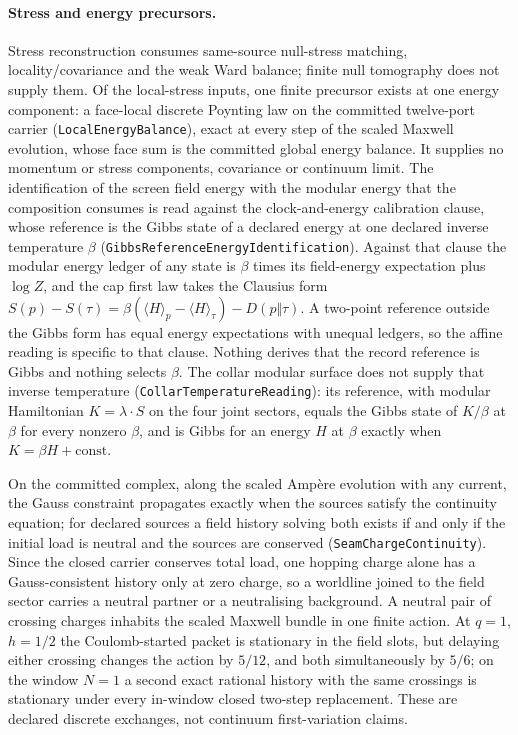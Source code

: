 \documentclass[11pt]{article}
\begin{document}
\paragraph{Stress and energy precursors.}
Stress reconstruction consumes same-source null-stress matching,
locality/covariance and the weak Ward balance; finite null tomography does
not supply them. Of the local-stress inputs, one finite precursor exists at
one energy component: a face-local discrete Poynting law on the committed
twelve-port carrier (\texttt{LocalEnergyBalance}), exact at every step of the
scaled Maxwell evolution, whose face sum is the committed global energy
balance. It supplies no momentum or stress components, covariance or
continuum limit. The identification of the screen field energy with the
modular energy that the composition consumes is read against the
clock-and-energy calibration clause, whose reference is the Gibbs state of a
declared energy at one declared inverse temperature \(\beta\)
(\texttt{GibbsReferenceEnergyIdentification}). Against that clause the modular
energy ledger of any state is \(\beta\) times its field-energy expectation plus
\(\log Z\), and the cap first law takes the Clausius form
\(S(p)-S(\tau)=\beta(\langle H\rangle_p-\langle H\rangle_\tau)-D(p\Vert\tau)\).
A two-point reference outside the Gibbs form has equal energy expectations with
unequal ledgers, so the affine reading is specific to that clause. Nothing
derives that the record reference is Gibbs and nothing selects \(\beta\). The
collar modular surface does not supply that inverse temperature
(\texttt{CollarTemperatureReading}): its reference, with modular Hamiltonian
\(K=\lambda\cdot S\) on the four joint sectors, equals the Gibbs state of
\(K/\beta\) at \(\beta\) for every nonzero \(\beta\), and is Gibbs for an
energy \(H\) at \(\beta\) exactly when \(K=\beta H+\mathrm{const}\).

On the committed complex, along the scaled Amp\`ere evolution with any
current, the Gauss constraint propagates exactly when the sources satisfy the
continuity equation; for declared sources a field history solving both exists
if and only if the initial load is neutral and the sources are conserved
(\texttt{SeamChargeContinuity}). Since the closed carrier conserves total load,
one hopping charge alone has a Gauss-consistent history only at zero charge,
so a worldline joined to the field sector carries a neutral partner or a
neutralising background. A neutral pair of crossing charges inhabits the
scaled Maxwell bundle in one finite action. At $q=1$, $h=1/2$ the
Coulomb-started packet is stationary in the field slots, but delaying either
crossing changes the action by $5/12$, and both simultaneously by $5/6$; on the
window $N=1$ a second exact rational history with the same crossings is
stationary under every in-window closed two-step replacement. These are
declared discrete exchanges, not continuum first-variation claims.
\end{document}
